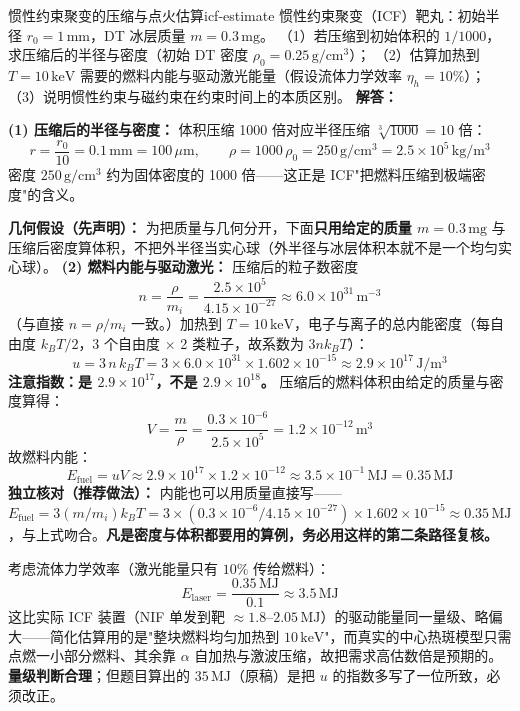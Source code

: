 
\begin{example}{惯性约束聚变的压缩与点火估算}{icf-estimate}
惯性约束聚变（ICF）靶丸：初始半径 $r_0 = 1\,\mathrm{mm}$，DT 冰层质量 $m = 0.3\,\mathrm{mg}$。
（1）若压缩到初始体积的 $1/1000$，求压缩后的半径与密度（初始 DT 密度 $\rho_0 = 0.25\,\mathrm{g/cm^3}$）；
（2）估算加热到 $T=10\,\mathrm{keV}$ 需要的燃料内能与驱动激光能量（假设流体力学效率 $\eta_h = 10\%$）；
（3）说明惯性约束与磁约束在约束时间上的本质区别。
\tcblower
\textbf{解答：}

\textbf{(1) 压缩后的半径与密度：} 体积压缩 1000 倍对应半径压缩 $\sqrt[3]{1000}=10$ 倍：
\[
r = \frac{r_0}{10} = 0.1\,\mathrm{mm} = 100\,\mu\mathrm{m}, \qquad \rho = 1000\,\rho_0 = 250\,\mathrm{g/cm^3} = 2.5\times10^5\,\mathrm{kg/m^3}
\]
密度 $250\,\mathrm{g/cm^3}$ 约为固体密度的 1000 倍——这正是 ICF"把燃料压缩到极端密度"的含义。

\textbf{几何假设（先声明）：} 为把质量与几何分开，下面\textbf{只用给定的质量 $m=0.3\,\mathrm{mg}$} 与压缩后密度算体积，不把外半径当实心球（外半径与冰层体积本就不是一个均匀实心球）。
\textbf{(2) 燃料内能与驱动激光：} 压缩后的粒子数密度
\[
n = \frac{\rho}{m_i} = \frac{2.5\times10^{5}}{4.15\times10^{-27}} \approx 6.0\times10^{31}\,\mathrm{m^{-3}}
\]
（与直接 $n=\rho/m_i$ 一致。）加热到 $T=10\,\mathrm{keV}$，电子与离子的总内能密度（每自由度 $k_{\!B}T/2$，3 个自由度 $\times$ 2 类粒子，故系数为 $3nk_{\!B}T$）：
\[
u = 3\,n\,k_{\!B}T = 3\times6.0\times10^{31}\times1.602\times10^{-15}
\approx 2.9\times10^{17}\,\mathrm{J/m^3}
\]
\textbf{注意指数：是 $2.9\times10^{17}$，不是 $2.9\times10^{18}$。} 压缩后的燃料体积由给定的质量与密度算得：
\[
V = \frac{m}{\rho} = \frac{0.3\times10^{-6}}{2.5\times10^{5}} = 1.2\times10^{-12}\,\mathrm{m^3}
\]
故燃料内能：
\[
E_{\text{fuel}} = uV \approx 2.9\times10^{17}\times1.2\times10^{-12} \approx 3.5\times10^{-1}\,\mathrm{MJ} = 0.35\,\mathrm{MJ}
\]
\textbf{独立核对（推荐做法）：} 内能也可以用质量直接写——$E_{\text{fuel}}=3(m/m_i)k_{\!B}T=3\times(0.3\times10^{-6}/4.15\times10^{-27})\times1.602\times10^{-15}\approx0.35\,\mathrm{MJ}$，与上式吻合。\textbf{凡是密度与体积都要用的算例，务必用这样的第二条路径复核。}

考虑流体力学效率（激光能量只有 $10\%$ 传给燃料）：
\[
E_{\text{laser}} = \frac{0.35\,\mathrm{MJ}}{0.1} \approx 3.5\,\mathrm{MJ}
\]
这比实际 ICF 装置（NIF 单发到靶 $\approx1.8$--$2.05\,\mathrm{MJ}$）的驱动能量同一量级、略偏大——简化估算用的是"整块燃料均匀加热到 $10\,\mathrm{keV}$"，而真实的中心热斑模型只需点燃一小部分燃料、其余靠 $\alpha$ 自加热与激波压缩，故把需求高估数倍是预期的。\textbf{量级判断合理}；但题目算出的 $35\,\mathrm{MJ}$（原稿）是把 $u$ 的指数多写了一位所致，必须改正。


\end{example}
